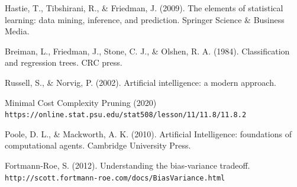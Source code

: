 \documentclass{article}
\begin{document}
    \begin{thebibliography}{9}
        Hastie, T., Tibshirani, R., \& Friedman, J. (2009). 
        The elements of statistical learning: data mining, 
        inference, and prediction. Springer Science \& Business Media.
        
        Breiman, L., Friedman, J., Stone, C. J., \& Olshen, R. A. (1984). 
        Classification and regression trees. CRC press.

        Russell, S., \& Norvig, P. 
        (2002). Artificial intelligence: a modern approach.

        Minimal Cost Complexity Pruning (2020)
        \\\texttt{https://online.stat.psu.edu/stat508/lesson/11/11.8/11.8.2}
        
        Poole, D. L., \& 
        Mackworth, A. K. (2010). 
        Artificial Intelligence: foundations of
         computational agents. Cambridge University Press.

        
        Fortmann-Roe, S. (2012). Understanding the bias-variance tradeoff. 
        \\\texttt{http://scott.fortmann-roe.com/docs/BiasVariance.html} 
        
        \end{thebibliography}









    









    


    
\end{document}
